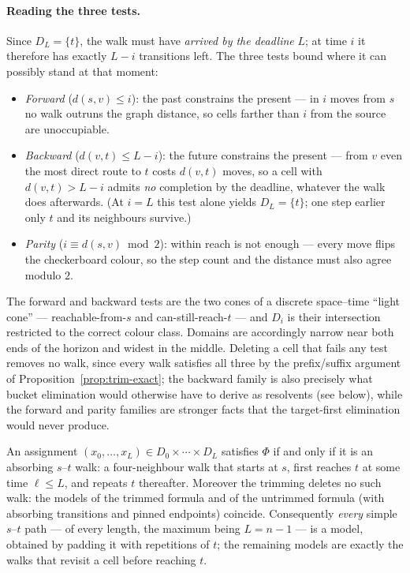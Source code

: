 \paragraph{Reading the three tests.}
Since $D_L=\{t\}$, the walk must have \emph{arrived by the deadline}
$L$; at time $i$ it therefore has exactly $L-i$ transitions left. The
three tests bound where it can possibly stand at that moment:
\begin{itemize}
\item \emph{Forward} ($d(s,v)\le i$): the past constrains the present —
  in $i$ moves from $s$ no walk outruns the graph distance, so cells
  farther than $i$ from the source are unoccupiable.
\item \emph{Backward} ($d(v,t)\le L-i$): the future constrains the
  present — from $v$ even the most direct route to $t$ costs $d(v,t)$
  moves, so a cell with $d(v,t)>L-i$ admits \emph{no} completion by the
  deadline, whatever the walk does afterwards. (At $i=L$ this test alone
  yields $D_L=\{t\}$; one step earlier only $t$ and its neighbours
  survive.)
\item \emph{Parity} ($i\equiv d(s,v) \bmod 2$): within reach is not
  enough — every move flips the checkerboard colour, so the step count
  and the distance must also agree modulo $2$.
\end{itemize}
The forward and backward tests are the two cones of a discrete
space--time ``light cone'' — reachable-from-$s$ and
can-still-reach-$t$ — and $D_i$ is their intersection restricted to the
correct colour class. Domains are accordingly narrow near both ends of
the horizon and widest in the middle. Deleting a cell that fails any
test removes no walk, since every walk satisfies all three by the
prefix/suffix argument of Proposition~\ref{prop:trim-exact}; the
backward family is also precisely what bucket elimination would
otherwise have to derive as resolvents (see below), while the forward
and parity families are stronger facts that the target-first elimination
would never produce.

\begin{proposition}
\label{prop:trim-exact}
An assignment $(x_0,\dots,x_L)\in D_0\times\cdots\times D_L$ satisfies
$\Phi$ if and only if it is an absorbing $s$--$t$ walk: a four-neighbour
walk that starts at $s$, first reaches $t$ at some time
$\ell \le L$, and repeats $t$ thereafter. Moreover the trimming deletes
no such walk: the models of the trimmed formula and of the untrimmed
formula (with absorbing transitions and pinned endpoints) coincide.
Consequently \emph{every} simple $s$--$t$ path — of every length, the
maximum being $L=n-1$ — is a model, obtained by padding it with
repetitions of $t$; the remaining models are exactly the walks that
revisit a cell before reaching $t$.
\end{proposition}

